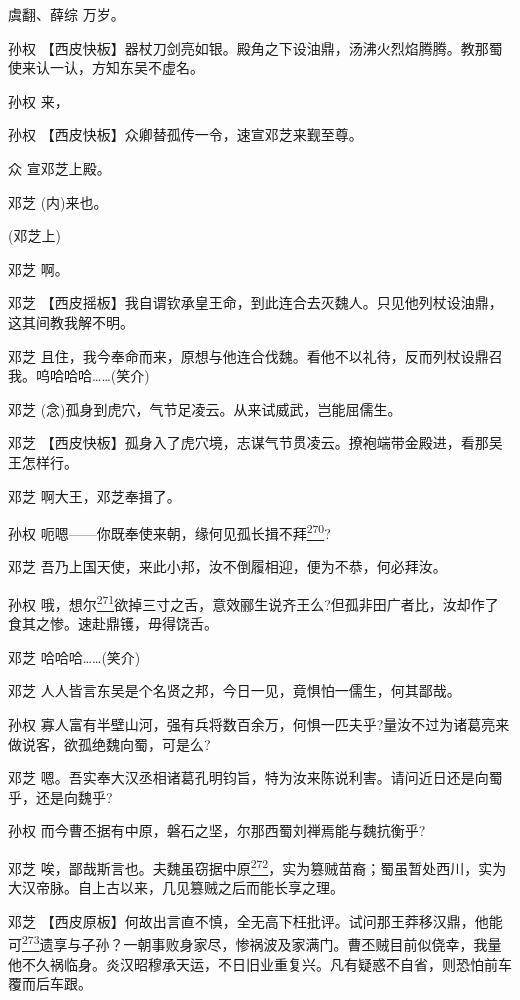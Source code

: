 虞翻、薛综 万岁。

孙权
【西皮快板】器杖刀剑亮如银。殿角之下设油鼎，汤沸火烈焰腾腾。教那蜀使来认一认，方知东吴不虚名。

孙权 来，

孙权 【西皮快板】众卿替孤传一令，速宣邓芝来觐至尊。

众 宣邓芝上殿。

邓芝 (内)来也。

(邓芝上)

邓芝 啊。

邓芝
【西皮摇板】我自谓钦承皇王命，到此连合去灭魏人。只见他列杖设油鼎，这其间教我解不明。

邓芝
且住，我今奉命而来，原想与他连合伐魏。看他不以礼待，反而列杖设鼎召我。呜哈哈哈\ldots{}\ldots{}(笑介)

邓芝 (念)孤身到虎穴，气节足凌云。从来试威武，岂能屈儒生。

邓芝
【西皮快板】孤身入了虎穴境，志谋气节贯凌云。撩袍端带金殿进，看那吴王怎样行。

邓芝 啊大王，邓芝奉揖了。

孙权
呃嗯------你既奉使来朝，缘何见孤长揖不拜\protect\hyperlink{fn270}{\textsuperscript{270}}?

邓芝 吾乃上国天使，来此小邦，汝不倒履相迎，便为不恭，何必拜汝。

孙权
哦，想尔\protect\hyperlink{fn271}{\textsuperscript{271}}欲掉三寸之舌，意效郦生说齐王么?但孤非田广者比，汝却作了食其之惨。速赴鼎镬，毋得饶舌。

邓芝 哈哈哈\ldots{}\ldots{}(笑介)

邓芝 人人皆言东吴是个名贤之邦，今日一见，竟惧怕一儒生，何其鄙哉。

孙权
寡人富有半壁山河，强有兵将数百余万，何惧一匹夫乎?量汝不过为诸葛亮来做说客，欲孤绝魏向蜀，可是么?

邓芝
嗯。吾实奉大汉丞相诸葛孔明钧旨，特为汝来陈说利害。请问近日还是向蜀乎，还是向魏乎?

孙权 而今曹丕据有中原，磐石之坚，尔那西蜀刘禅焉能与魏抗衡乎?

邓芝
唉，鄙哉斯言也。夫魏虽窃据中原\protect\hyperlink{fn272}{\textsuperscript{272}}，实为篡贼苗裔；蜀虽暂处西川，实为大汉帝脉。自上古以来，几见篡贼之后而能长享之理。

邓芝
【西皮原板】何故出言直不慎，全无高下枉批评。试问那王莽移汉鼎，他能可\protect\hyperlink{fn273}{\textsuperscript{273}}遗享与子孙？一朝事败身家尽，惨祸波及家满门。曹丕贼目前似侥幸，我量他不久祸临身。炎汉昭穆承天运，不日旧业重复兴。凡有疑惑不自省，则恐怕前车覆而后车跟。

